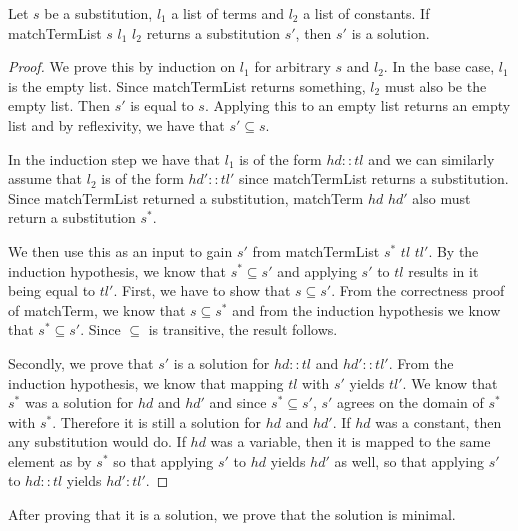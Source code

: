\begin{lemma}[\matchTermListFindsSolution]
    Let $s$ be a substitution, $l_1$ a list of terms and $l_2$ a list of constants. If matchTermList $s$ $l_1$ $l_2$ returns a substitution $s'$, then $s'$ is a solution.
\end{lemma}
\begin{proof}
    We prove this by induction on $l_1$ for arbitrary $s$ and $l_2$.
    In the base case, $l_1$ is the empty list. Since matchTermList returns something, $l_2$ must also be the empty list. Then $s'$ is equal to $s$. Applying this to an empty list returns an empty list and by reflexivity, we have that $s' \subseteq s$.

    In the induction step we have that $l_1$ is of the form $hd::tl$ and we can similarly assume that $l_2$ is of the form $hd'::tl'$ since matchTermList returns a substitution. Since matchTermList returned a substitution, matchTerm $hd$ $hd'$ also must return a substitution $s^\ast$.

    We then use this as an input to gain $s'$ from matchTermList $s^\ast$ $tl$ $tl'$. By the induction hypothesis, we know that $s^\ast \subseteq s'$ and applying $s'$ to $tl$ results in it being equal to $tl'$. 
    First, we have to show that $s \subseteq s'$. From the correctness proof of matchTerm, we know that $s \subseteq s^\ast$ and from the induction hypothesis we know that $s^\ast \subseteq s'$. Since $\subseteq$ is transitive, the result follows.

    Secondly, we prove that $s'$ is a solution for $hd::tl$ and $hd'::tl'$. From the induction hypothesis, we know that mapping $tl$ with $s'$ yields $tl'$. We know that $s^\ast$ was a solution for $hd$ and $hd'$ and since $s^\ast \subseteq s'$, $s'$ agrees on the domain of $s^\ast$ with $s^\ast$. Therefore it is still a solution for $hd$ and $hd'$. If $hd$ was a constant, then any substitution would do. If $hd$ was a variable, then it is mapped to the same element as by $s^\ast$ so that applying $s'$ to $hd$ yields $hd'$ as well, so that applying $s'$ to $hd::tl$ yields $hd':tl'$. 
\end{proof}

After proving that it is a solution, we prove that the solution is minimal.

